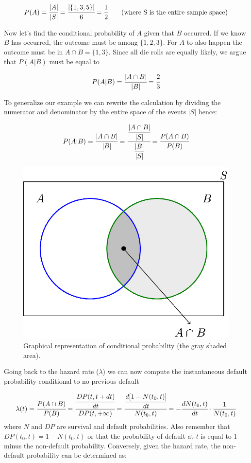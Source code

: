 \begin{equation}
P(A) = \cfrac{|A|}{|S|} = \cfrac{|\{1,3,5\}|}{6} = \cfrac{1}{2}\qquad\textrm{(where S is the entire sample space)}\end{equation}

Now let's find the conditional probability of \(A\) given that \(B\)
occurred. If we know \(B\) has occurred, the outcome must be among
\(\{1,2,3\}\). For \(A\) to also happen the outcome must be in
\(A\cap B = \{1,3\}\). Since all die rolls are equally likely, we argue
that \(P(A|B)\) must be equal to

\begin{equation}P(A|B) = \cfrac{|A\cap B|}{|B|} = \cfrac{2}{3}\end{equation}

To generalize our example we can rewrite the calculation by dividing the
numerator and denominator by the entire space of the events \(|S|\)
hence:

\begin{equation}P(A|B) = \cfrac{|A\cap B|}{|B|} = \cfrac{\cfrac{|A\cap B|}{|S|}}{\cfrac{|B|}{|S|}} = \cfrac{P(A\cap B)}{P(B)}\end{equation}

\begin{figure}[tb]
\centering
\includegraphics[width=0.7\linewidth]{figures/conditional_b.png}
\caption{Graphical representation of conditional probability (the gray shaded area).}
\end{figure}

Going back to the hazard rate ($\lambda$) we can now compute the instantaneous default probability conditional to no previous default 

\begin{equation}\lambda(t) = \cfrac{P(A\cap B)}{P(B)} = \cfrac{\cfrac{DP(t, t+dt)}{dt}}{DP(t, +\infty)} = \cfrac{\cfrac{d[1-N(t_0, t)]}{dt}}{N(t_0, t)} = -\cfrac{dN(t_0, t)}{dt}\cdot\frac{1}{N(t_0, t)}\end{equation}
where $N$ and $DP$ are survival and default probabilities.%
Also remember that $DP(t_0, t) = 1 - N(t_0, t)$ or that the probability of default at $t$ is equal to 1 minus the non-default probability.
Conversely, given the hazard rate, the non-default probability can be
determined as:

